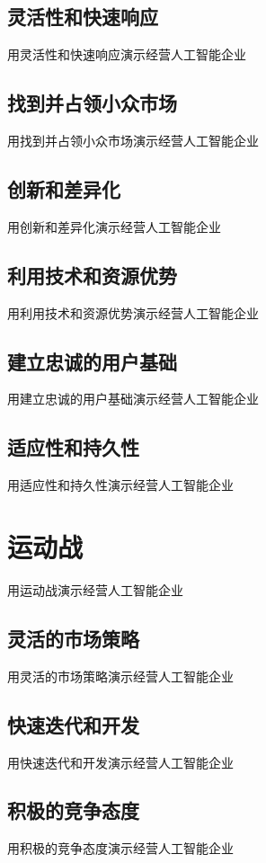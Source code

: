 \documentclass[12pt]{book}
\begin{document}
\subsection{灵活性和快速响应}
用灵活性和快速响应演示经营人工智能企业

\subsection{找到并占领小众市场}
用找到并占领小众市场演示经营人工智能企业

\subsection{创新和差异化}
用创新和差异化演示经营人工智能企业

\subsection{利用技术和资源优势}
用利用技术和资源优势演示经营人工智能企业

\subsection{建立忠诚的用户基础}
用建立忠诚的用户基础演示经营人工智能企业

\subsection{适应性和持久性}
用适应性和持久性演示经营人工智能企业


\section{运动战}
用运动战演示经营人工智能企业
\subsection{灵活的市场策略}
用灵活的市场策略演示经营人工智能企业

\subsection{快速迭代和开发}
用快速迭代和开发演示经营人工智能企业

\subsection{积极的竞争态度}
用积极的竞争态度演示经营人工智能企业
\end{document}
